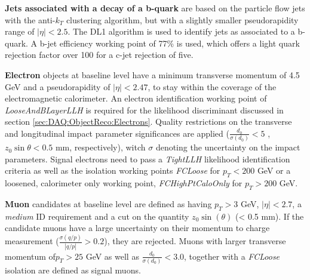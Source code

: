 \textbf{Jets associated with a decay of a b-quark} are based on the particle flow jets with the anti-$k_T$ clustering algorithm,  but with a slightly smaller pseudorapidity range of $|\eta| <2.5$.  The DL1 algorithm \cite{DL1btagging} is used to identify jets as associated to a b-quark. A b-jet efficiency working point of 77\% is used,  which offers a light quark rejection factor over 100 for a c-jet rejection of five.

\textbf{Electron} objects at baseline level have a minimum transverse momentum of 4.5 GeV and a pseudorapidity of $|\eta| < 2.47$, to stay within the coverage of the electromagnetic calorimeter.  An electron identification working point of \textit{LooseAndBLayerLLH} is required for the likelihood discriminant discussed in section \ref{sec:DAQ:ObjectReco:Electrons}.  Quality restrictions on the transverse and longitudinal impact parameter significances are applied ($\frac{d_0}{\sigma(d_0)}<5$ ,  $z_0 \sin\theta < 0.5\text{ mm}$, respectively),  witch $\sigma$ denoting the uncertainty on the impact parameters.  Signal electrons need to pass a \textit{TightLLH} likelihood identification criteria as well as the isolation working points \textit{FCLoose} for $p_T<200 $ GeV or a loosened,  calorimeter only working point, \textit{FCHighPtCaloOnly} for $p_T > 200$ GeV.  

\textbf{Muon} candidates at baseline level are defined as having $p_T > 3$ GeV,  $|\eta| < 2.7$,  a \textit{medium} ID requirement and a cut on the quantity $z_0 \sin(\theta)$ (< 0.5 mm). 
If the candidate muons have a large uncertainty on their momentum to charge measurement ($\frac{\sigma(q/p)}{ |q/p|} > 0.2$), they are rejected.  Muons with larger transverse momentum of$p_T >25 $ GeV as well as $\frac{d_0}{\sigma(d_0)}<3.0$, together with a \textit{FCLoose} isolation are defined as signal muons.

